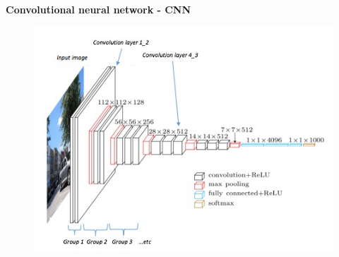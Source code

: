 \documentclass[xcolor=dvipsnames]{beamer}
\begin{document}
\begin{frame}{\bf Convolutional neural network - CNN}

  \begin{figure}
    \includegraphics[scale=0.5]{../diagrams/cnn.jpg}
  \end{figure}

\end{frame}
\end{document}
